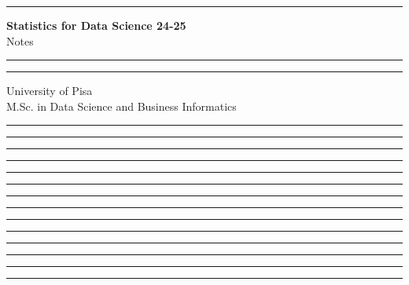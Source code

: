 \documentclass[11pt]{article}
\newcommand{\separate}{\begin{center}\textcolor{NavyBlue}{\rule{16cm}{1mm}}\end{center}}
\begin{document}
\begin{titlepage}
    \hrule
    \vspace{15pt}
    \begin{center}
        \Huge{\textbf{\Huge \textbf{Statistics for Data Science 24-25}} \\ Notes}\\
    \end{center}
    \vspace{15pt}
    \hrule
    \vfill
    \hrule
    \begin{center}
        \Large University of Pisa \\ M.Sc. in Data Science and Business Informatics
    \end{center}
\end{titlepage}

\tableofcontents
\clearpage


\separate
\separate
\separate
\separate
\separate
\separate
\separate
\separate
\separate
\separate
\separate
\separate
\separate
\separate
\end{document}
